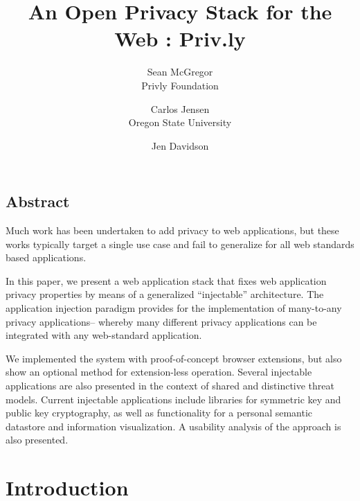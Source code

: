 \documentclass[letterpaper,twocolumn,10pt]{article}
\begin{document}
\date{}

\title{\Large \bf An Open Privacy Stack for the Web : Priv.ly }

\author{
{\rm Sean McGregor }\\
Privly Foundation
\and
{\rm Carlos Jensen}\\
Oregon State University
\and
{\rm Jen Davidson}
} %

\maketitle

\thispagestyle{empty}


\subsection*{Abstract}
Much work has been undertaken to add privacy to web applications, but
these works typically target a single use case and fail to generalize for all
web standards based applications.

In this paper, we present a web application stack that fixes web application privacy 
properties by means of a generalized ``injectable'' architecture. The application injection paradigm provides
for the implementation of many-to-any privacy applications-- whereby many different privacy applications can be integrated with any web-standard application.

We implemented the system with proof-of-concept browser extensions, 
but also show an optional method for extension-less operation. Several injectable applications are also presented in the context of
shared and distinctive threat models. 
Current injectable applications include libraries for symmetric key and public key cryptography, 
as well as functionality for a personal semantic datastore and information visualization.
A usability analysis of the approach is also presented.





\section{Introduction}
\end{document}
